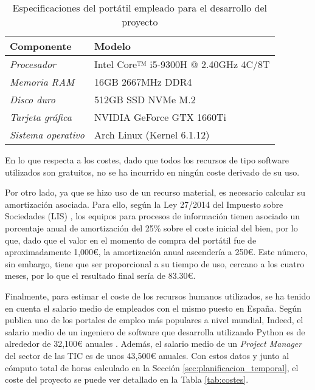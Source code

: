 \bigskip
\begin{table}[H]
	\centering
	\begin{tabular}{|l|l|}
		\rowcolor{udcpink!25}
		\hline
		\small \textbf{Componente}        & \small \textbf{Modelo}                      \\ \hline
		\small \textit{Procesador}        & \small Intel Core™ i5-9300H @ 2.40GHz 4C/8T \\ \hline
		\small \textit{Memoria RAM}       & \small 16GB 2667MHz DDR4                    \\ \hline
		\small \textit{Disco duro}        & \small 512GB SSD NVMe M.2                   \\ \hline
		\small \textit{Tarjeta gráfica}   & \small NVIDIA GeForce GTX 1660Ti            \\ \hline
		\small \textit{Sistema operativo} & \small Arch Linux (Kernel 6.1.12)                    \\ \hline
	\end{tabular}
	\caption{Especificaciones del portátil empleado para el desarrollo del proyecto}
	\label{tab:costes_hardware}
\end{table}

\bigskip
En lo que respecta a los costes, dado que todos los recursos de tipo software utilizados son gratuitos, no se ha incurrido en ningún coste
derivado de su uso.

\bigskip
Por otro lado, ya que se hizo uso de un recurso material,
es necesario calcular su amortización asociada. Para ello, según la Ley 27/2014 del Impuesto sobre Sociedades (LIS) \cite{leysociedades},
los equipos para procesos de información tienen asociado un porcentaje anual de amortización del 25\% sobre el coste inicial del bien,
por lo que, dado que el valor en el momento de compra del portátil fue de aproximadamente 1,000€, la amortización anual ascendería a 250€. Este número, sin embargo,
tiene que ser proporcional a su tiempo de uso, cercano a los cuatro meses, por lo que el resultado final sería de 83.30€.

\bigskip
Finalmente, para estimar el coste de los recursos
humanos utilizados, se ha tenido en cuenta el salario medio de empleados con el mismo puesto en España. Según publica
uno de los portales de empleo más populares a nivel mundial, Indeed, el salario medio de un ingeniero de software que desarrolla
utilizando Python es de alrededor de 32,100€ anuales \cite{indeedsalario}. Además, el salario medio de un \textit{Project Manager}
del sector de las TIC es de unos 43,500€ anuales. Con estos datos y junto al cómputo total de horas calculado en la Sección \ref{sec:planificacion_temporal},
el coste del proyecto se puede ver detallado en la Tabla \ref{tab:costes}.

